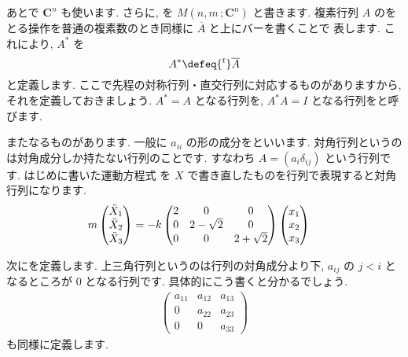\documentclass[openany, a4paper, oneside]{jsbook}
\begin{document}
あとで $\bm{C}^{n}$ も使います.
さらに, を $M \left ( n,m \, ;\bm{C}^n \right)$ と書きます.
複素行列 $A$ のをとる操作を普通の複素数のとき同様に $\overline{A}$ と上にバーを書くことで
表します.
これにより,  $A^{*}$ を
\begin{equation}
    A^{*} \defeq {^t}\overline{A}
\end{equation}
と定義します. ここで先程の対称行列・直交行列に対応するものがありますから, それを定義しておきましょう.
 $A^{*}=A$ となる行列を,
 $A^{*}A = I$ となる行列をと呼びます.



またなるものがあります.
一般に $a_{ii}$ の形の成分をといいます.
対角行列というのは対角成分しか持たない行列のことです.
すなわち $A = (a_{i} \delta _{ij} )$ という行列です. はじめに書いた運動方程式
を $X$ で書き直したものを行列で表現すると対角行列になります.
\begin{align}
    m \begin{pmatrix} \ddot{X}_{1} \\ \ddot{X}_{2} \\ \ddot{X}_{3} \end{pmatrix}
    &= -k \begin{pmatrix} 2 & 0 & 0 \\ 0 & 2- \sqrt{2} & 0 \\ 0 & 0 & 2 + \sqrt{2} \end{pmatrix}
    \begin{pmatrix} x_{1} \\ x_{2} \\ x_{3} \end{pmatrix} \notag
\end{align}

次にを定義します.
上三角行列というのは行列の対角成分より下,  $a_{ij}$ の $j< i$ となるところが
 $0$ となる行列です. 具体的にこう書くと分かるでしょう.
\begin{align}
    \begin{pmatrix} a_{11} & a_{12} & a_{13} \\
                    0 & a_{22} & a_{23} \\
                    0 & 0 & a_{33}
    \end{pmatrix}
\end{align}
も同様に定義します.
\end{document}
